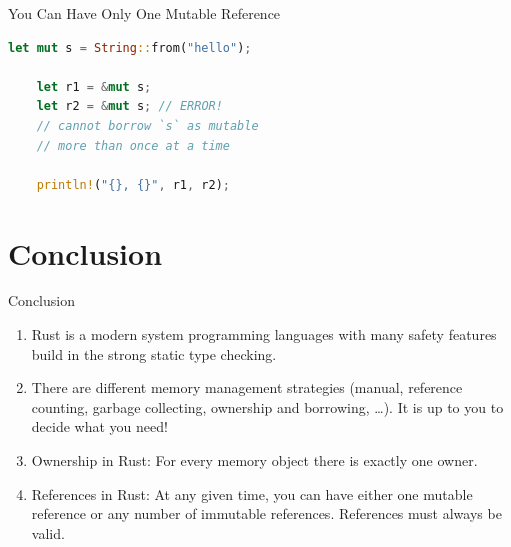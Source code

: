 \begin{Frame}[fragile]{You Can Have Only One Mutable Reference}
  \begin{lstlisting}[language=Rust,gobble=4]
    let mut s = String::from("hello");

    let r1 = &mut s;
    let r2 = &mut s; // ERROR!
    // cannot borrow `s` as mutable
    // more than once at a time

    println!("{}, {}", r1, r2);
  \end{lstlisting}
\end{Frame}

\section*{Conclusion}

\begin{frame}{Conclusion}
  \begin{enumerate}
    \item \alert{Rust} is a \alert{modern system programming languages} with many safety features build in the \alert{strong static type checking}.
    \item There are different \alert{memory management strategies} (manual, reference counting, garbage collecting, ownership and borrowing, \ldots). It is \alert{up to you to} decide what you need!
    \item \alert{Ownership} in Rust: For every memory object there is \alert{exactly one owner}.
    \item \alert{References} in Rust: At any given time, you can have \alert{either one mutable reference or any number of immutable references}. References must always be valid.
  \end{enumerate}
\end{frame}
